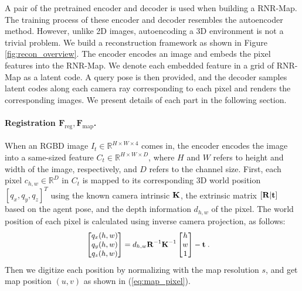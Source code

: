 \documentclass[10pt,twocolumn,letterpaper]{article}
\def\proposed{RNR-Map\xspace}
\begin{document}
A pair of the pretrained encoder and decoder is used when building a \proposed.
%
The training process of these encoder and decoder resembles the autoencoder method.
%
However, unlike 2D images, autoencoding a 3D environment is not a trivial problem. 
%
We build a reconstruction framework as shown in Figure \ref{fig:recon_overview}. 
%
%
The encoder encodes an image and embeds the pixel features into the \proposed.
%
We denote each embedded feature in a grid of \proposed as a latent code.
%
A query pose is then provided, and the decoder samples latent codes along each camera ray corresponding to each pixel and renders the corresponding images.
%
We present details of each part in the following section.
%
\vspace{-0.2cm}
\paragraph{Registration $\mathbf{F_\mathrm{reg}, F_\mathrm{map}}$.}
When an RGBD image $I_t \in \mathbb{R}^{H\times W\times 4}$ comes in, the encoder encodes the image into a same-sized feature $C_t \in \mathbb{R}^{H\times W\times D}$, where $H$ and $W$ refers to height and width of the image, respectively, and $D$ refers to the channel size.
%
First, each pixel $c_{h,w}\in \mathbb{R}^{D}$ in $C_t$ is mapped to its corresponding 3D world position $[q_x,q_y,q_z]^T$ using the known camera intrinsic $\bold{K}$, the extrinsic matrix $[\bold{R|t}]$ based on the agent pose, and the depth information $d_{h,w}$ of the pixel.
%
The world position of each pixel is calculated using inverse camera projection, as follows:
\begin{equation} \label{eq:inverse_projection}
\small
\begin{split}
\begin{bmatrix}
q_x(h,w) \\
q_y(h,w) \\
q_z(h,w) \\
\end{bmatrix} &= d_{h,w} \bold{R}^{-1} \bold{K}^{-1} 
\begin{bmatrix}
h \\
w \\
1 \\
\end{bmatrix} 
- \bold{t} \;.
\end{split}
\end{equation}
%
Then we digitize each position by normalizing with the map resolution $s$, and get map position $(u,v)$ as shown in (\ref{eq:map_pixel}). 
\end{document}
